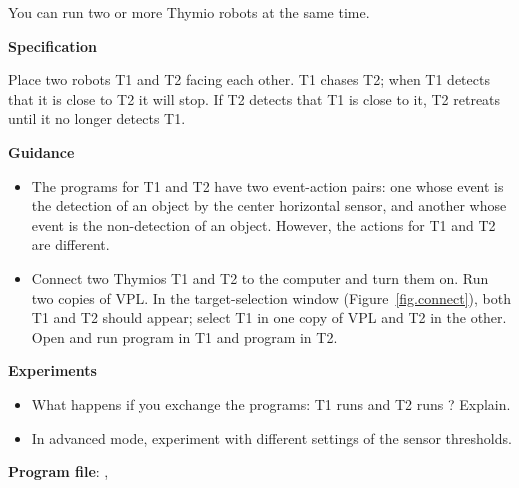 \label{ch.two}

You can run two or more Thymio robots at the same time.

\textbf{Specification}

Place two robots T1 and T2 facing each other. T1 chases T2; when
T1 detects that it is close to T2 it will stop. If T2 detects that T1 is
close to it, T2 retreats until it no longer detects T1. 

\textbf{Guidance}

\begin{itemize}

\item The programs for T1 and T2 have two event-action pairs: one whose
event is the detection of an object by the center horizontal sensor, and
another whose event is the non-detection of an object. However, the
actions for T1 and T2 are different.

\item Connect two Thymios T1 and T2 to the computer and turn them on.
Run two copies of VPL. In the target-selection window
(Figure~\ref{fig.connect}), both T1 and T2 should appear; select T1 in
one copy of VPL and T2 in the other. Open and run program  in
T1 and program  in T2.
 
\end{itemize}

\textbf{Experiments}

\begin{itemize}

\item What happens if you exchange the programs: T1 runs
 and T2 runs ? Explain.

\item In advanced mode, experiment with different settings of the sensor
thresholds.

\end{itemize}


{\raggedleft \hfill \textbf{Program file}: , }

\bigskip

